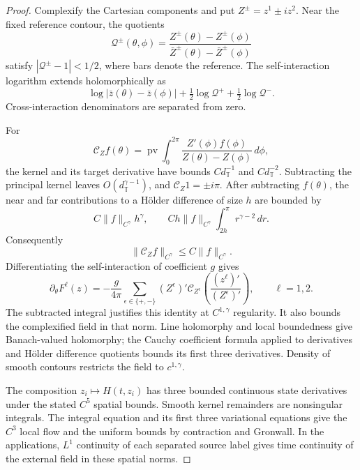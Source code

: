 \documentclass[11pt]{amsart}
\theoremstyle{remark}
\numberwithin{equation}{section}
\newcommand{\T}{\mathbb T}
\begin{document}
\begin{proof}
Complexify the Cartesian components and put $Z^\pm=z^1\pm iz^2$.
Near the fixed reference contour, the quotients
\[
 \mathcal Q^\pm(\theta,\phi)=
 \frac{Z^\pm(\theta)-Z^\pm(\phi)}
      {\bar Z^\pm(\theta)-\bar Z^\pm(\phi)}
\]
satisfy $|\mathcal Q^\pm-1|<1/2$, where bars denote the reference.
The self-interaction logarithm extends holomorphically as
\[
 \log|\bar z(\theta)-\bar z(\phi)|
       +\tfrac12\log\mathcal Q^++\tfrac12\log\mathcal Q^-.
\]
Cross-interaction denominators are separated from zero.

For
\[
 \mathcal C_Zf(\theta)=\operatorname{pv}\int_0^{2\pi}
       \frac{Z'(\phi)f(\phi)}{Z(\theta)-Z(\phi)}\,d\phi,
\]
the kernel and its target derivative have bounds $Cd_\T^{-1}$
and $Cd_\T^{-2}$. Subtracting the principal kernel leaves
$O(d_\T^{\gamma-1})$, and $\mathcal C_Z1=\pm i\pi$.
After subtracting $f(\theta)$, the near and far contributions to
a H\"older difference of size $h$ are bounded by
\[
 C\|f\|_{C^\gamma}h^\gamma,
 \qquad Ch\|f\|_{C^\gamma}\int_{2h}^\pi r^{\gamma-2}\,dr.
\]
Consequently
\begin{equation}\label{pc:cauchyholder}
 \|\mathcal C_Zf\|_{C^\gamma}\le C\|f\|_{C^\gamma}.
\end{equation}
Differentiating the self-interaction of coefficient $g$ gives
\begin{equation}\label{pc:Fderivative}
 \partial_\theta F^\ell(z)
 =-\frac g{4\pi}\sum_{\epsilon\in\{+,-\}}
       (Z^\epsilon)'\mathcal C_{Z^\epsilon}
       \left(\frac{(z^\ell)'}{(Z^\epsilon)'}\right),\qquad\ell=1,2.
\end{equation}
The subtracted integral justifies this identity at $C^{1,\gamma}$
regularity. It also bounds the complexified field in that norm.
Line holomorphy and local boundedness give Banach-valued
holomorphy; the Cauchy coefficient formula applied to derivatives
and H\"older difference quotients bounds its first three derivatives.
Density of smooth contours restricts the field to $c^{1,\gamma}$.

The composition $z_i\mapsto H(t,z_i)$ has three bounded continuous
state derivatives under the stated $C^5$ spatial bounds. Smooth
kernel remainders are nonsingular integrals. The integral equation
and its first three variational equations give the $C^3$ local flow
and the uniform bounds by contraction and Gronwall. In the
applications, $L^1$ continuity of each separated source label gives
time continuity of the external field in these spatial norms.
\end{proof}
\end{document}
